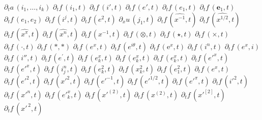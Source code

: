 \documentclass{article}
\begin{document}
$\partial_t a\,(i_1,\ldots,i_k)$ $\partial_t f\,(i_1,t)$ $\partial_t f\,(i',t)$ $\partial_t f\,(e',t)$ $\partial_t f\,(e_1,t)$
$\partial_t f\,(\mathbf e_1,t)$ $\partial_t f\,(e_1,e_2)$ $\partial_t f\,(i^j,t)$ $\partial_t f\,(e^2,t)$ $\partial_x u\,(j_1,t)$
$\partial_t f\,(\hat{x^{-1}},t)$ $\partial_t f\,(\hat{x^{1/2}},t)$ $\partial_t f\,(\hat{x^\pi},t)$ $\partial_t f\,(\hat{x^n},t)$ $\partial_t f\,(x^{-1},t)$
$\partial_t f\,(\otimes,t)$ $\partial_t f\,(\star,t)$ $\partial_t f\,(\times,t)$ $\partial_t f\,(\cdot,t)$ $\partial_t f\,(\ast,\ast)$
$\partial_t f\,(e^{x},t)$ $\partial_t f\,(e^{i\theta},t)$ $\partial_t f\,(\mathrm{e}^{x},t)$ $\partial_t f\,(i^n,t)$ $\partial_t f\,(e^{x},i)$
$\partial_t f\,(i'',t)$ $\partial_t f\,(e^{\prime},t)$ $\partial_t f\,(e_k^{x},t)$
$\partial_t f\,(e^x_k,t)$ $\partial_t f\,(e_k^x,t)$ $\partial_t f\,(e'^x,t)$ $\partial_t f\,({e'}^x,t)$ $\partial_t f\,(i^n_j,t)$
$\partial_t f\,(e^2_k,t)$ $\partial_t f\,(x^2_k,t)$ $\partial_t f\,(e_1^2,t)$ $\partial_t f\,(e^x,t)$
$\partial_t f\,(e'^2,t)$ $\partial_t f\,(x'^2,t)$ $\partial_t f\,(e'^{-1},t)$ $\partial_t f\,(e'^{1/2},t)$ $\partial_t f\,(e'^\pi,t)$
$\partial_t f\,(i'^2,t)$ $\partial_t f\,(x'^n,t)$ $\partial_t f\,(e'^x_k,t)$
$\partial_t f\,(x'^{(2)},t)$ $\partial_t f\,(x^{(2)},t)$ $\partial_t f\,(x'^{[2]},t)$ $\partial_t f\,(x'^{\,2},t)$
\end{document}
